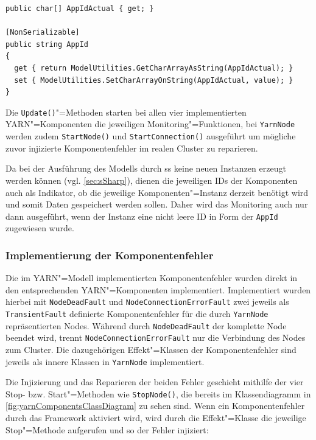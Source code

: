 \begin{lstlisting}[label=lst:modelCharArrayAsString,style=cs,
caption={[Implementierung der Eigenschaft AppId]
    Implementierung der Eigenschaft \texttt{AppId}.
    Die beiden Methoden \texttt{GetCharArrayAsString} und \texttt{SetCharArrayOnString} führen die Konvertierung in den \texttt{char}"=Array bzw. des \texttt{char}"=Arrays in einen String durch.}]
public char[] AppIdActual { get; }

[NonSerializable]
public string AppId
{
  get { return ModelUtilities.GetCharArrayAsString(AppIdActual); }
  set { ModelUtilities.SetCharArrayOnString(AppIdActual, value); }
}
\end{lstlisting}

Die \texttt{Update()}"=Methoden starten bei allen vier implementierten \ac{YARN}"=Komponenten die jeweiligen Monitoring"=Funktionen, bei \texttt{YarnNode} werden zudem \texttt{StartNode()} und \texttt{StartConnection()} ausgeführt um mögliche zuvor injizierte Komponentenfehler im realen Cluster zu reparieren.

Da bei der Ausführung des Modells durch \ac{ss} keine neuen Instanzen erzeugt werden können (vgl. \cref{sec:sSharp}), dienen die jeweiligen IDs der Komponenten auch als Indikator, ob die jeweilige Komponenten"=Instanz derzeit benötigt wird und somit Daten gespeichert werden sollen.
Daher wird das Monitoring auch nur dann ausgeführt, wenn der Instanz eine nicht leere ID \zB in Form der \texttt{AppId} zugewiesen wurde.

\subsubsection{Implementierung der Komponentenfehler}
\label{subsubsec:yarnComponentFaults}

Die im \ac{YARN}"=Modell implementierten Komponentenfehler wurden direkt in den entsprechenden \ac{YARN}"=Komponenten implementiert.
Implementiert wurden hierbei mit \texttt{NodeDeadFault} und \texttt{NodeConnectionErrorFault} zwei jeweils als \texttt{TransientFault} definierte Komponentenfehler für die durch \texttt{YarnNode} repräsentierten Nodes.
Während durch \texttt{NodeDeadFault} der komplette Node beendet wird, trennt \texttt{NodeConnectionErrorFault} nur die Verbindung des Nodes zum Cluster.
Die dazugehörigen Effekt"=Klassen der Komponentenfehler sind jeweils als innere Klassen in \texttt{YarnNode} implementiert.

Die Injizierung und das Reparieren der beiden Fehler geschieht mithilfe der vier Stop- bzw. Start"=Methoden wie \zB \texttt{StopNode()}, die bereits im Klassendiagramm in \cref{fig:yarnComponentsClassDiagram} zu sehen sind.
Wenn ein Komponentenfehler durch das Framework aktiviert wird, wird durch die Effekt"=Klasse die jeweilige Stop"=Methode aufgerufen und so der Fehler injiziert:

